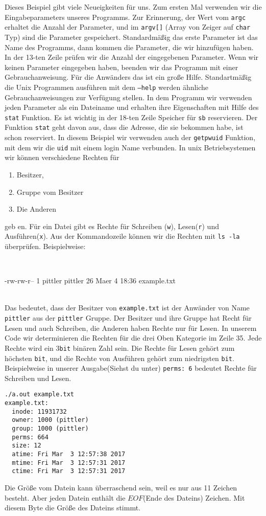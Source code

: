Dieses Beispiel gibt  viele Neueigkeiten für uns. Zum ersten Mal verwenden wir die Eingabeparameters unseres 
Programms. Zur Erinnerung, der Wert vom \texttt{argc} erhaltet die Anzahl der Parameter, und im \texttt{argv[]} 
(Array von Zeiger auf \texttt{char} Typ) sind die Parameter gespeichert. Standardmäßig das erste Parameter ist das 
Name des Programms, dann kommen die Parameter, die wir hinzufügen haben. In der 13-ten Zeile prüfen wir die Anzahl 
der eingegebenen Parameter. Wenn wir keinen Parameter eingegeben haben, beenden wir das Programm mit einer Gebrauchanweisung.
Für die Anwänders das ist ein große Hilfe. Standartmäßig die Unix Programmen ausführen mit dem \texttt{--help} werden
ähnliche Gebrauchanweisungen zur Verfügung stellen.
In dem Programm wir verwenden jeden Parameter als ein Dateiname und erhalten ihre Eigenschaften mit Hilfe des \texttt{stat} 
Funktion. Es ist wichtig in der 18-ten Zeile Speicher für \texttt{sb} reservieren. Der Funktion \texttt{stat} geht davon aus, 
dass die Adresse, die sie bekommen habe, ist schon reserviert. In diesem Beispiel wir verwenden auch der \texttt{getpwuid} Funktion, 
mit dem wir die \texttt{uid} mit einem login Name verbunden. In unix Betriebsystemen wir können verschiedene Rechten für 
\begin{enumerate}
\item Besitzer, 
\item Gruppe vom Besitzer
\item Die Anderen
\end{enumerate}
geb en. Für ein Datei gibt es Rechte für Schreiben (\texttt{w}), Lesen(\texttt{r}) und Ausführen(\texttt{x}). Aus der Kommandozeile
können wir die Rechten mit \texttt{ls -la} überprüfen. Beispielweise:\\
\\
\begin{verb}
-rw-rw-r-- 1 pittler pittler 26 Maer  4 18:36 example.txt
\end{verb}\\
Das bedeutet, dass der Besitzer von \texttt{example.txt} ist der Anwänder von Name \texttt{pittler} aus der \texttt{pittler} Gruppe.
Der Besitzer und ihre Gruppe hat Recht für Lesen und auch Schreiben, die Anderen haben Rechte nur für Lesen.
In unserem Code wir determinieren die Rechten für die drei Oben Kategorie im Zeile 35. Jede Rechte wird ein 3\texttt{bit} binären
Zahl sein. Die Rechte für Lesen gehört zum höchsten \texttt{bit}, und die Rechte von Ausführen gehört zum niedrigsten \texttt{bit}. 
Beispielweise in unserer Ausgabe(Siehst du unter) \texttt{perms: 6} bedeutet Rechte für Schreiben und Lesen.
\begin{lstlisting}
./a.out example.txt
example.txt:
  inode: 11931732
  owner: 1000 (pittler)
  group: 1000 (pittler)
  perms: 664
  size: 12
  atime: Fri Mar  3 12:57:38 2017
  mtime: Fri Mar  3 12:57:31 2017
  ctime: Fri Mar  3 12:57:31 2017
\end{lstlisting}
Die Größe vom Datein kann überraschend sein, weil es nur aus 11 Zeichen besteht. Aber jeden Datein enthält die 
$EOF$(Ende des Dateins) Zeichen. Mit diesem Byte die Größe des Dateins stimmt.
